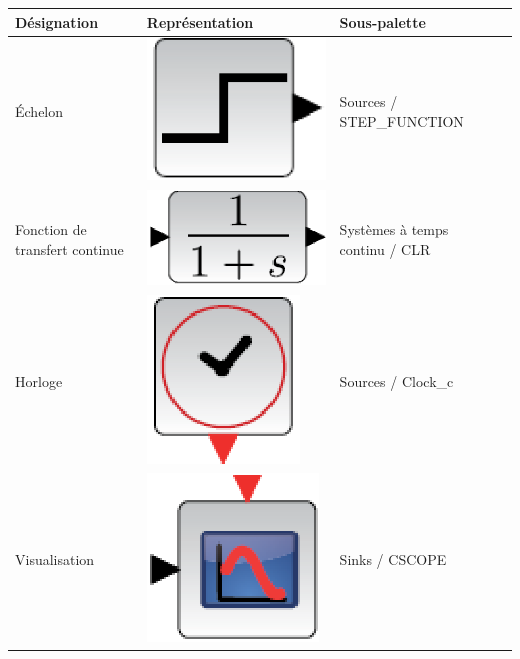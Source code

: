 \begin{table}[!h]
    \centering
\begin{tabular}{|M{4cm}|M{6cm}|M{4cm}|N}
    \hline
    Désignation   & Représentation & Sous-palette & \\
    \hline
    \'Echelon     & \begin{minipage}{6cm}\centering \includegraphics[width=0.25\linewidth]{fig/scilab05.eps}\end{minipage} & Sources / STEP\_FUNCTION & \\[2.75em]
    \hline
    Fonction de transfert continue     & \begin{minipage}{6cm}\centering \includegraphics[width=0.25\linewidth]{fig/scilab06.eps}\end{minipage} & Systèmes à temps continu / CLR & \\[3em]
    \hline
    Horloge       & \begin{minipage}{6cm}\centering \includegraphics[width=0.2\linewidth]{fig/scilab07.eps}\end{minipage} & Sources / Clock\_c & \\[2.75em]
    \hline
    Visualisation & \begin{minipage}{6cm}\centering \includegraphics[width=0.25\linewidth]{fig/scilab08.eps}\end{minipage} & Sinks / CSCOPE& \\[2.75em]
    \hline
\end{tabular}
\end{table}

